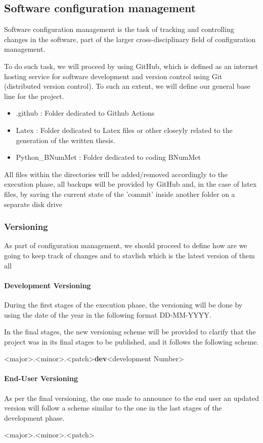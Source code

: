 \subsection{Software configuration management}
Software configuration management is the task of tracking and controlling changes in the software, part of the larger cross-disciplinary field of configuration management.\cite{Pre94}

To do such task, we will proceed by using GitHub, which is defined as an internet hosting service for software development and version control using Git (distributed version control). To such an extent, we will define our general base line for the project.
\begin{itemize}
    \item .github : Folder dedicated to Github Actions
    \item Latex : Folder dedicated to Latex files or other closeyly related to the generation of the written thesis.
    \item Python\_BNumMet : Folder dedicated to coding BNumMet
\end{itemize}

All files within the directories will be added/removed accordingly to the execution phase, all backups will be provided by GitHub and, in the case of latex files, by saving the current state of the 'commit' inside another folder on a separate disk drive
\subsubsection{Versioning}
As part of configuration management, we should proceed to define how are we going to keep track of changes and to stavlish which is the latest version of them all
\paragraph{Development Versioning}
During the first stages of the execution phase, the versioning will be done by using the date of the year in the following format DD-MM-YYYY.

In the final stages, the new versioning scheme will be provided to clarify that the project was in its final stages to be published, and it follows the following scheme.
\begin{center}
    <major>.<minor>.<patch>\textbf{dev}<development Number>
\end{center}
\paragraph{End-User Versioning}
As per the final versioning, the one made to announce to the end user an updated version will follow a scheme similar to the one in the last stages of the development phase.
\begin{center}
    <major>.<minor>.<patch>
\end{center}



